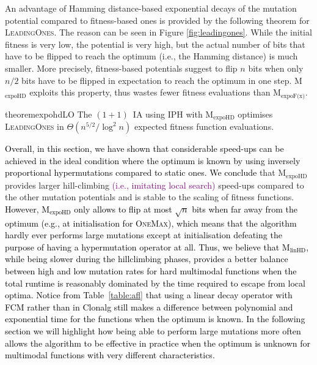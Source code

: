 \documentclass[lettersize,journal]{IEEEtran}
\newcommand{\new}[1]{\textcolor{black}{#1}}
\newcommand{\rerev}[1]{\textcolor{purple}{#1}}
\newcommand{\oneoneIA}{$(1+1)$~IA}
\newcommand{\linHD}{M$_{\text{linHD}}$}
\newcommand{\expoF}{M$_{\text{expoF(x)}}$}
\newcommand{\expoHD}{M$_{\text{expoHD}}$}
\newcommand{\IPHfcm}{IPH}
\begin{document}
 

An advantage of Hamming distance-based exponential decays of the mutation potential
compared to fitness-based ones is provided by the following theorem for \textsc{LeadingOnes}.
The reason can be seen in Figure \ref{fig:leadingones}.  While the initial fitness is very low, the potential is very high, but the actual number of bits that have to be flipped to reach the optimum (i.e., the Hamming distance) is much smaller. More precisely, fitness-based potentials suggest to flip $n$ bits when only $n/2$ bits have to be flipped in expectation to reach the optimum in one step. 
{\expoHD } exploits this property, thus wastes fewer fitness evaluations than \expoF. 




\begin{restatable}{theorem}{expohdLO}\label{thm:expohdLO}
The {\oneoneIA } using \IPHfcm{} with {\expoHD } optimises
\textsc{LeadingOnes} in $\Theta(n^{5/2}/\log^2 n)$ expected fitness function
evaluations.
\end{restatable}



 \new{Overall, in this section, we have shown that considerable speed-ups can be achieved in the ideal condition where the optimum is known by using inversely proportional hypermutations compared to static ones.
We conclude} that {\expoHD } provides larger hill-climbing \rerev{(i.e., imitating local search)} speed-ups compared to the other mutation potentials and is stable to the scaling of fitness functions.
\new{However, {\expoHD } only allows to flip at most $\sqrt{n}$ bits when far away from the optimum (e.g., at initialisation for \textsc{OneMax}), which means that the algorithm hardly ever performs large mutations except at initialisation defeating the purpose of having a hypermutation operator at all. Thus, we believe that \linHD, while being slower during the hillclimbing phases, provides a better balance between high and low mutation rates for hard multimodal functions when the total runtime is reasonably dominated by the time required to escape from local optima. Notice from Table~\ref{table:afl} that using a linear decay operator with FCM  rather than in Clonalg still makes a difference between polynomial and exponential time for the functions when the optimum is known. In the following section we will highlight how being able to perform large mutations more often allows the algorithm to be effective in practice when the optimum is unknown for multimodal functions with very different characteristics.}
\end{document}
